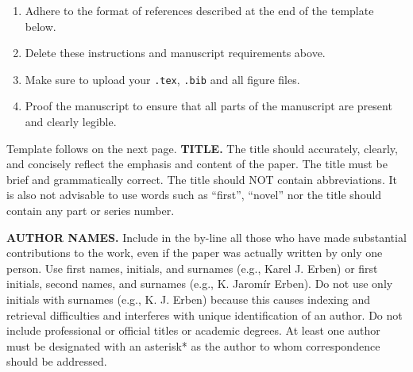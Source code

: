 \documentclass[english]{jasb}
\begin{document}
\begin{enumerate}
\begin{enumerate}
    \item Vector graphics (recommended)
    \begin{enumerate}
        \item Format: PDF, EPS, drawn using the \texttt{tikz} package
    \end{enumerate}
    \item Raster graphics
    \begin{enumerate}
        \item Resolution: 300 dpi for color, 600 dpi for grayscale art, and at 1200 dpi for black and white line art (e.g. graphs). Ideally, include graphics with \texttt{scale=1} to avoid errors.
        \item Format: PNG, JPG
    \end{enumerate}
\end{enumerate}
\item Adhere to the format of references described at the end of the template below.
\item Delete these instructions and manuscript requirements above.
\item Make sure to upload your \texttt{.tex}, \texttt{.bib} and all figure files.
\item Proof the manuscript to ensure that all parts of the manuscript are present and clearly legible.
\end{enumerate}
Template follows on the next page.
\newpage
\textbf{TITLE.} The title should accurately, clearly, and concisely reflect the emphasis and content of the paper. The title must be brief and grammatically correct. The title should NOT contain abbreviations. It is also not advisable to use words such as ``first'', ``novel'' nor the title should contain any part or series number.

\textbf{AUTHOR NAMES.} Include in the by-line all those who have made substantial contributions to the work, even if the paper was actually written by only one person. Use first names, initials, and surnames (e.g., Karel J. Erben) or first initials, second names, and surnames (e.g., K. Jaromír Erben). Do not use only initials with surnames (e.g., K. J. Erben) because this causes indexing and retrieval difficulties and interferes with unique identification of an author. Do not include professional or official titles or academic degrees. At least one author must be designated with an asterisk* as the author to whom correspondence should be addressed.
\end{document}
